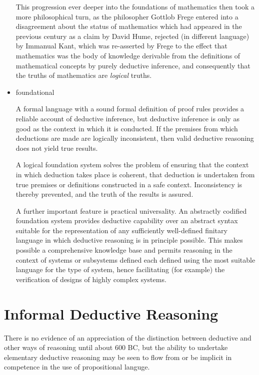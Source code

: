 \documentclass[10pt,titlepage]{book}
\begin{document}
\begin{itemize}
  This progression ever deeper into the foundations of mathematics then took a more philosophical turn, as the philosopher Gottlob Frege entered into a disagreement about the status of mathematics which had appeared in the previous century as a claim by David Hume, rejected (in different language) by Immanual Kant, which was re-asserted by Frege to the effect that mathematics was the body of knowledge derivable from the definitions of mathematical concepts by purely deductive inference, and consequently that the truths of mathematics are \emph{logical} truths.
  
\item foundational

  A formal language with a sound formal definition of proof rules provides a reliable account of deductive inference, but deductive inference is only as good as the context in which it is conducted.
  If the premises from which deductions are made are logically inconsistent, then valid deductive reasoning does not yield true results.

  A logical foundation system solves the problem of ensuring that the context in which deduction takes place is coherent, that deduction is undertaken from true premises or definitions constructed in a safe context.
  Inconsistency is thereby prevented, and the truth of the results is assured.

  A further important feature is practical universality.
  An abstractly codified foundation system provides deductive capability over an abstract syntax suitable for the representation of any sufficiently well-defined finitary language in which deductive reasoning is in principle possible.
  This makes possible a comprehensive knowledge base and permits reasoning in the context of systems or subsystems defined each defined using the most suitable language for the type of system, hence facilitating (for example) the verification of designs of highly complex systems.
  
\end{itemize}

\section{Informal Deductive Reasoning}

There is no evidence of an appreciation of the distinction between deductive and other ways of reasoning until about 600 BC, but the ability to undertake elementary deductive reasoning may be seen to flow from or be implicit in competence in the use of propositional languge.
\end{document}
